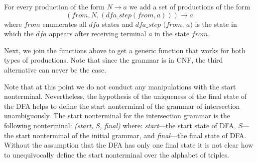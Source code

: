 For every production of the form $N \to a$ we add a set of productions of the form $$(\textit{from}, N, (\textit{dfa\_step}(\textit{from}, a))) \to a$$ where $\textit{from}$ enumerates all $\textit{dfa}$ states and $\textit{dfa\_step (from, a)}$ is the state in which the $\textit{dfa}$ appears after receiving terminal $a$ in the state $\textit{from}$.


Next, we join the functions above to get a generic function that works for both types of productions.
Note that since the grammar is in CNF, the third alternative can never be the case.




Note that at this point we do not conduct any manipulations with the start nonterminal. Nevertheless, the hypothesis of the uniqueness of the final state of the DFA helps to define the start nonterminal of the grammar of intersection unambiguously. The start nonterminal for the intersection grammar is the following nonterminal: \textit{(start, S, final)} where: \textit{start}---the start state of DFA, \textit{S}---the start nonterminal of the initial grammar, and \textit{final}---the final state of DFA. Without the assumption that the DFA has only one final state it is not clear how to unequivocally define the start nonterminal over the alphabet of triples.

